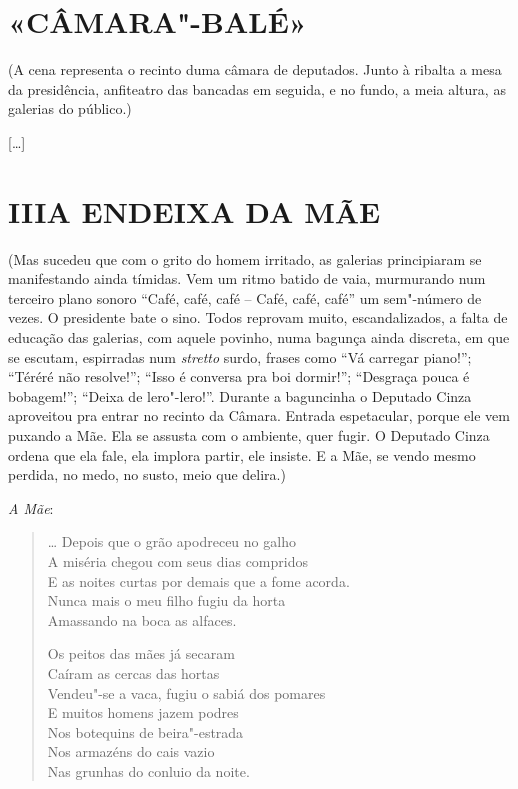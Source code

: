 {\section*{«CÂMARA"-BALÉ»}\medskip

\hfill\parbox{240pt}{(A cena representa o recinto duma câmara de
deputados. Junto à ribalta a mesa da
presidência, anfiteatro das bancadas em
seguida, e no fundo, a meia altura, as galerias do público.)}

{[}\ldots{}{]}

\section*{III\break A ENDEIXA DA MÃE}\medskip

\hfill\parbox{240pt}{
(Mas sucedeu que com o grito do homem irritado, as galerias principiaram
se manifestando ainda tímidas. Vem um ritmo batido de vaia, murmurando
num terceiro plano sonoro ``Café, café, café -- Café, café, café'' um
sem"-número de vezes. O presidente bate o sino. Todos reprovam muito,
escandalizados, a falta de educação das galerias, com aquele povinho,
numa bagunça ainda discreta, em que se escutam, espirradas num
\emph{stretto} surdo, frases como ``Vá carregar piano!''; ``Téréré não
resolve!''; ``Isso é conversa pra boi dormir!''; ``Desgraça pouca é
bobagem!''; ``Deixa de lero"-lero!''. Durante a baguncinha o Deputado
Cinza aproveitou pra entrar no recinto da Câmara. Entrada espetacular,
porque ele vem puxando a Mãe. Ela se assusta com o ambiente, quer fugir.
O Deputado Cinza ordena que ela fale, ela implora partir, ele insiste. E
a Mãe, se vendo mesmo perdida, no medo, no susto, meio que delira.)
}

\bigskip

\emph{A Mãe}:

\begin{verse}
\ldots{} Depois que o grão apodreceu no galho\\
A miséria chegou com seus dias compridos\\
E as noites curtas por demais que a fome acorda.\\
Nunca mais o meu filho fugiu da horta\\
Amassando na boca as alfaces.

Os peitos das mães já secaram\\
Caíram as cercas das hortas\\
Vendeu"-se a vaca, fugiu o sabiá dos pomares\\
E muitos homens jazem podres\\
Nos botequins de beira"-estrada\\
Nos armazéns do cais vazio\\
Nas grunhas do conluio da noite.


\end{verse}}

